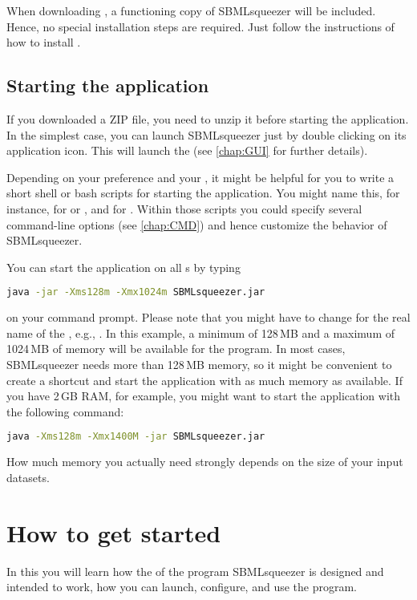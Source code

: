 When downloading \Garuda, a functioning copy of SBMLsqueezer will be included.
Hence, no special installation steps are required. Just follow the instructions
of how to install \Garuda.

\section{Starting the application}
\label{startingTheProgram}

If you downloaded a ZIP file, you need to unzip it before starting the
application. In the simplest case, you can launch SBMLsqueezer just by double
clicking on its application icon. This will launch the \GUI
(see \vref{chap:GUI} for further details).

Depending on your preference and your \OS, it might be helpful for
you to write a short shell or bash scripts for starting the application.
You might name this, for instance,  for \Linux or \MacOSX, and
 for \Windows. Within those scripts you could specify several
command-line options (see \vref{chap:CMD}) and hence customize the behavior of
SBMLsqueezer. 

You can start the application on all {\OS}s by typing
\begin{lstlisting}[language=bash,numbers=none]
java -jar -Xms128m -Xmx1024m SBMLsqueezer.jar
\end{lstlisting}
on your command prompt. Please note that you might have to change
 for the real name of the \JAR, e.g.,
. In this example, a minimum of 128\,MB
and a maximum of 1024\,MB of memory will be available for the program. In most cases,
SBMLsqueezer needs more than 128\,MB memory, so it might be convenient to create a
shortcut and start the application with as much memory as available. If you
have 2\,GB RAM, for example, you might want to start the application with the
following command:
\begin{lstlisting}[language=bash,numbers=none]
java -Xms128m -Xmx1400M -jar SBMLsqueezer.jar
\end{lstlisting}
How much memory you actually need strongly depends on the size of your input datasets.
%

\chapter{How to get started}
\label{chap:GUI}

In this  you will learn how the \GUI of the program
SBMLsqueezer is designed and intended to work, how you can launch, configure,
and use the program. 

